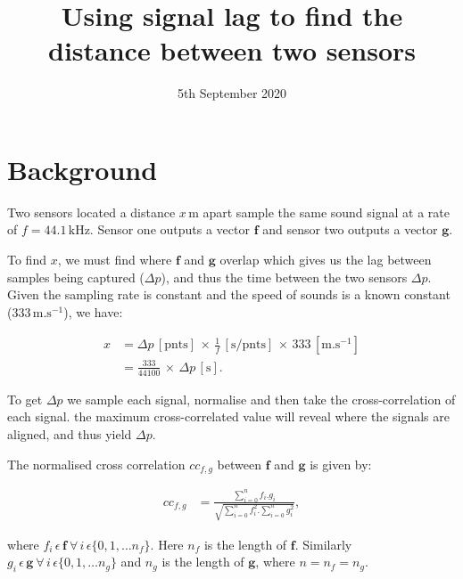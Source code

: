 \documentclass[prb,11pt,twocolumn]{revtex4-1}
\begin{document}
\title{Using signal lag to find the distance between two sensors}
\date{5th September 2020}

\maketitle

\section{Background}
Two sensors located a distance $x\,\mathrm{m}$ apart sample the same sound signal at a rate of $f=\mathrm{44.1\,kHz}$. Sensor one outputs a vector $\mathbf{f}$ and sensor two outputs a vector $\mathbf{g}$.

To find $x$, we must find where $\mathbf{f}$ and $\mathbf{g}$ overlap which gives us the lag between samples being captured ($\Delta p$), and thus the time between the two sensors $\Delta p$. Given the sampling rate is constant and the speed of sounds is a known constant ($333\,\mathrm{m.s^{-1}}$), we have:

\begin{align}
    x &= \Delta p\, \mathrm{[pnts]}\, \times\, \frac{1}{f}\,\mathrm{[s/pnts]}\, \times\, 333\,\left[\mathrm{m.s^{-1}}\right] \nonumber \\
    &= \frac{333}{44100}\,\times\, \Delta p\, \mathrm{[s]}.
\end{align}

To get $\Delta p$ we sample each signal, normalise and then take the cross-correlation  of each signal. the maximum cross-correlated value will reveal where the signals are aligned, and thus yield $\Delta p$.

The normalised cross correlation $cc_{f,g}$ between $\mathbf{f}$ and $\mathbf{g}$ is given by:

\begin{align}
    cc_{f,g} &= \frac{\sum\limits_{i=0}^{n} f_i.g_i}{\sqrt{\sum\limits_{i=0}^{n}f_i^2.\sum\limits_{i=0}^{n}g_i^2}},
\end{align}

where $f_i\,\epsilon\,\mathbf{f}\: \forall\, i\,\epsilon\{0,1,\dots n_f \}$. Here $n_f$ is the length of $\mathbf{f}$. Similarly $g_i\,\epsilon\,\mathbf{g}\: \forall\, i\,\epsilon\{0,1,\dots n_g \}$ and $n_g$ is the length of $\mathbf{g}$, where $n=n_f=n_g$.


\end{document}
